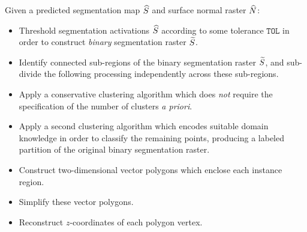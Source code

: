 \begin{leftbar}
  \noindent
  Given a predicted segmentation map $\widehat{S}$ and surface normal raster $\widehat{N}$:
  \begin{itemize}[leftmargin=*]
    \item Threshold segmentation activations $\widehat{S}$ according to some tolerance $\texttt{TOL}$ in order to construct \emph{binary} segmentation raster $\widetilde{S}$.
    \item Identify connected sub-regions of the binary segmentation raster $\widetilde{S}$, and sub-divide the following processing independently across these sub-regions.
    \item Apply a conservative clustering algorithm which does \emph{not} require the specification of the number of clusters \textit{a priori}.
    \item Apply a second clustering algorithm which encodes suitable domain knowledge in order to classify the remaining points, producing a labeled partition of the original binary segmentation raster.
    \item Construct two-dimensional vector polygons which enclose each instance region.
    \item Simplify these vector polygons.
    \item Reconstruct $z$-coordinates of each polygon vertex.
  \end{itemize}
\end{leftbar}
